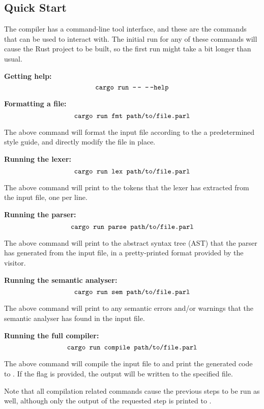 \newpage

\subsection{Quick Start}

The  compiler has a command-line tool interface, and these
are the commands that can be used to interact with. The initial run for any of
these commands will cause the Rust project to be built, so the first run might
take a bit longer than usual.

\textbf{Getting help:} $$\texttt{cargo run --\,-- --\,--help}$$

\textbf{Formatting a  file:} $$\texttt{cargo run fmt path/to/file.parl}$$

The above command will format the input file according to the a predetermined
style guide, and directly modify the file in place.

\textbf{Running the lexer:} $$\texttt{cargo run  lex path/to/file.parl}$$

The above command will print to  the tokens that the lexer has extracted from the input file, one per line.

\textbf{Running the parser:} $$\texttt{cargo run parse path/to/file.parl}$$

The above command will print to  the abstract syntax tree (AST)
that the parser has generated from the input file, in a pretty-printed format
provided by the  visitor.

\textbf{Running the semantic analyser:} $$\texttt{cargo run sem path/to/file.parl}$$

The above command will print to  any semantic errors and/or warnings that the semantic analyser has found in the input file.

\textbf{Running the full compiler:} $$\texttt{cargo run  compile path/to/file.parl}$$

The above command will compile the input file to  and print the
generated code to . If the  flag is
provided, the output will be written to the specified file.

Note that all compilation related commands cause the previous steps to be run as
well, although only the output of the requested step is printed to
.
